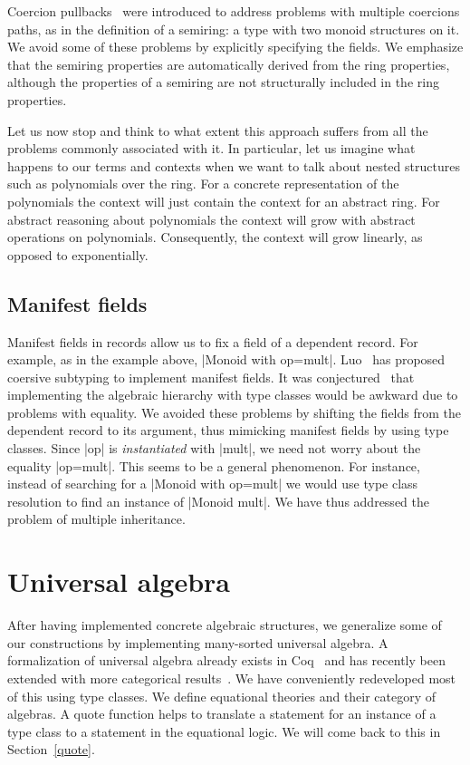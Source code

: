 \documentclass[a4paper,10pt,runningheads]{llncs}
\begin{document}
Coercion pullbacks~\cite{Hints} were introduced to address problems with multiple coercions paths,
as in the definition of a semiring: a type with two monoid structures on it. We avoid some
of these problems by explicitly specifying the fields. We emphasize that the semiring properties are
automatically derived from the ring properties, although the properties of a semiring are not
structurally included in the ring properties.

Let us now stop and think to what extent this approach suffers from all the problems commonly
associated with it. In particular, let us imagine what happens to our terms and contexts when we
want to talk about nested structures such as polynomials over the ring. For a concrete
representation of the polynomials the context will just contain the context for an abstract ring.
For abstract reasoning about polynomials the context will grow with abstract operations on
polynomials. Consequently, the context will grow linearly, as opposed to exponentially.

\subsection{Manifest fields}\label{manifest}

Manifest fields in records allow us to fix a field of a dependent record. For example, as in the
example above, |Monoid with op=mult|. 
Luo~\cite{DBLP:conf/types/Luo08} has proposed coersive subtyping to implement manifest fields.
It was conjectured~\cite{Hints} that implementing the algebraic hierarchy with type classes would
be awkward due to problems with equality. We avoided these problems by shifting the fields
from the dependent record to its argument, thus mimicking manifest fields by using type classes.
Since |op| is \emph{instantiated} with |mult|, we need not worry about the
equality |op=mult|. This seems to be a general phenomenon. For instance, instead of searching
for a |Monoid with op=mult| we would use type class resolution to find an instance of |Monoid mult|.
We have thus addressed the problem of multiple inheritance.

\section{Universal algebra}\label{univ}
After having implemented concrete algebraic structures, we generalize some of our constructions
by implementing many-sorted universal algebra. A formalization of universal algebra
already exists in Coq~\cite{DBLP:conf/tphol/Capretta99} and has recently been extended with
more categorical results~\cite{dominguez2008formalizing}. We have conveniently redeveloped most of
this using type classes. We define equational theories and their category of algebras. A quote
function helps to translate a statement for an instance of a type class to a statement in the
equational logic. We will come back to this in Section~\ref{quote}.
\end{document}
